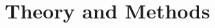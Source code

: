 \documentclass[mathserif,16pt,xcolor=table]{beamer}
\begin{document}
      \section{Theory and Methods}
\end{document}
